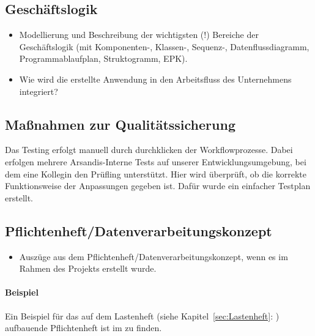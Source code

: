 \subsection{Geschäftslogik} %
\label{sec:Geschaeftslogik}

\begin{itemize}
	\item Modellierung und Beschreibung der wichtigsten (!) Bereiche der Geschäftslogik (\zB mit Kom\-po\-nen\-ten-, Klassen-, Sequenz-, Datenflussdiagramm, Programmablaufplan, Struktogramm, EPK).
	\item Wie wird die erstellte Anwendung in den Arbeitsfluss des Unternehmens integriert?
\end{itemize}


\subsection{Maßnahmen zur Qualitätssicherung} %
Das Testing erfolgt manuell durch \glqq durchklicken\grqq{} der Workflowprozesse.
Dabei erfolgen mehrere Arsandis-Interne Tests auf unserer Entwicklungsumgebung, bei dem eine Kollegin den Prüfling unterstützt.
Hier wird überprüft, ob die korrekte Funktionsweise der Anpassungen gegeben ist.
Dafür wurde ein einfacher Testplan erstellt. %

\subsection{Pflichtenheft/Datenverarbeitungskonzept} %
\label{sec:Pflichtenheft}
\begin{itemize}
	\item Auszüge aus dem Pflichtenheft/Datenverarbeitungskonzept, wenn es im Rahmen des Projekts erstellt wurde.
\end{itemize}

\paragraph{Beispiel}
Ein Beispiel für das auf dem Lastenheft (siehe Kapitel~\ref{sec:Lastenheft}: ) aufbauende Pflichtenheft ist im  zu finden.
